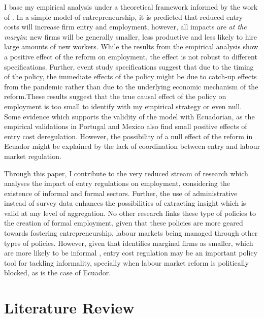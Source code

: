 \documentclass[11pt,a4paper]{article}\usepackage[]{graphicx}\usepackage[]{xcolor}
\begin{document}
I base my empirical analysis under a theoretical framework informed by the work of \textcite{Branstetter.2014}. In a simple model of entrepreneurship, it is predicted that reduced entry costs will increase firm entry and employment, however, all impacts are \textit{at the margin}: new firms will be generally smaller, less productive and less likely to hire large amounts of new workers. While the results from the empirical analysis show a positive effect of the reform on employment, the effect is not robust to different specifications. Further, event study specifications suggest that due to the timing of the policy, the immediate effects of the policy might be due to catch-up effects from the pandemic rather than due to the underlying economic mechanism of the reform.These results suggest that the true causal effect of the policy on employment is too small to identify with my empirical strategy or even null. Some evidence which supports the validity of the model with Ecuadorian, as the empirical validations in Portugal \parencite{Branstetter.2014} and Mexico \parencite{Kaplan.2011} also find small positive effects of entry cost deregulation. However, the possibility of a null effect of the reform in Ecuador might be explained by the lack of coordination between entry and labour market regulation.

Through this paper, I contribute to the very reduced stream of research which analyses the impact of entry regulations on employment, considering the existence of informal and formal sectors. Further, the use of administrative instead of survey data enhances the possibilities of extracting insight which is valid at any level of aggregation. No other research links these type of policies to the creation of formal employment, given that these policies are more geared towards fostering entrepreneurship, labour markets being managed through other types of policies. However, given that \textcite{Branstetter.2014} identifies marginal firms as smaller, which are more likely to be informal \parencite{ElianeElBadaoui.2010}, entry cost regulation may be an important policy tool for tackling informality, specially when labour market reform is politically blocked, as is the case of Ecuador. 

\section{Literature Review}
\end{document}

